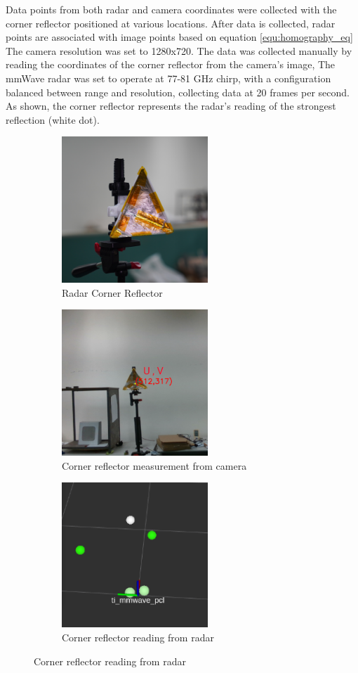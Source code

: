 Data points from both radar and camera coordinates were collected with the corner reflector positioned at various locations.
After data is collected, radar points are associated with image points based on equation \ref*{equ:homography_eq}
The camera resolution was set to 1280x720. 
The data was collected manually by reading the coordinates of the corner reflector from the camera's image, 
The mmWave radar was set to operate at 77-81 GHz chirp, 
with a configuration balanced between range and resolution, 
collecting data at 20 frames per second. 
As shown, the corner reflector represents the radar's reading of the strongest reflection (white dot).
\begin{figure}[hbpt]
    \centering
    \begin{subfigure}{0.25\linewidth}
        \includegraphics[width=5.5cm]{Figures/corner_reflector.jpg}
        \caption{Radar Corner Reflector}
        \label{subfig:corner_reflector_fig}
    \end{subfigure}
    \hfill
    \begin{subfigure}{0.25\linewidth}
        \centering
        \includegraphics[width=5.5cm]{Figures/camera_corner.png}
        \caption{Corner reflector measurement from camera}
        \label{subfig:camera_view_fig}
    \end{subfigure}
    \hfill
    \begin{subfigure}{0.25\linewidth}
        \centering
        \includegraphics[width=5.5cm]{Figures/radar_corner.png}
        \caption{Corner reflector reading from radar}
        \label{subfig:radar_view_fig}
    \end{subfigure}


\end{figure}
